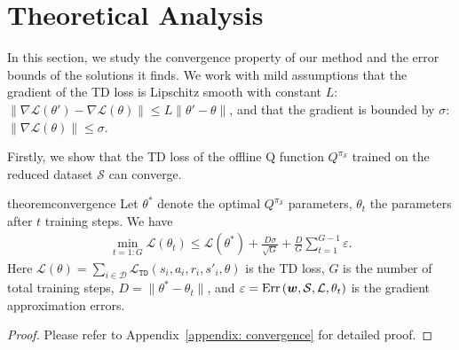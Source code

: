 \section{Theoretical Analysis}\label{sec:theory}

In this section, we study the convergence property of our method and the error bounds of the solutions it finds. We work with mild assumptions that the gradient of the TD loss is Lipschitz smooth with constant $L$: $\|\nabla \mathcal L(\theta') - \nabla \mathcal L(\theta)\| \leq L\|\theta' - \theta\|$, and that the gradient is bounded by $\sigma$: $\| \nabla \mathcal L(\theta) \| \leq \sigma$.

Firstly, we show that the TD loss of the offline Q function $Q^{\pi_\mathcal{S}}$ trained on the reduced dataset $\mathcal{S}$ can converge.
\begin{restatable}{theorem}{convergence}\label{thm:convergence}
    \label{thm:convergence}
    Let $\theta^*$ denote the optimal $Q^{\pi_\mathcal{S}}$ parameters, $\theta_t$ the parameters after $t$ training steps. We have
    \begin{align}
        \min_{t=1:G}\mathcal{L}(\theta_t)\leq \mathcal{L}(\theta^*) + \frac{D\sigma}{\sqrt{G}} + \frac{D}{G}\sum_{t=1}^{G-1}\varepsilon.
    \end{align}
    Here 
    $\mathcal{L}(\theta)=\sum_{i \in \mathcal{D}}\mathcal L_{\mathtt{TD}}(s_{i}, a_{i}, r_i, s'_{i}, \theta)$ is the TD loss, $G$ is the number of total training steps, $D=\|\theta^*-\theta_t\|$, and $\varepsilon=\operatorname{Err}\left({\bm{w}}, \mathcal{S}, \mathcal L, \theta_t\right)$ is the gradient approximation errors.
\end{restatable}
\begin{proof}
    Please refer to Appendix~\ref{appendix: convergence} for detailed proof. 
\end{proof}


